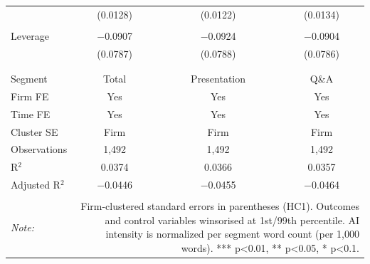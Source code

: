 \begin{table}[!htbp]
\begin{tabular}{@{\extracolsep{5pt}}lccc}
  & (0.0128) & (0.0122) & (0.0134) \\ 
  & & & \\ 
 Leverage & $-$0.0907 & $-$0.0924 & $-$0.0904 \\ 
  & (0.0787) & (0.0788) & (0.0786) \\ 
  & & & \\ 
\hline \\[-1.8ex] 
Segment & Total & Presentation & Q\&A \\ 
Firm FE & Yes & Yes & Yes \\ 
Time FE & Yes & Yes & Yes \\ 
Cluster SE & Firm & Firm & Firm \\ 
Observations & 1,492 & 1,492 & 1,492 \\ 
R$^{2}$ & 0.0374 & 0.0366 & 0.0357 \\ 
Adjusted R$^{2}$ & $-$0.0446 & $-$0.0455 & $-$0.0464 \\ 
\hline 
\hline \\[-1.8ex] 
\textit{Note:}  & \multicolumn{3}{r}{Firm-clustered standard errors in parentheses (HC1). Outcomes and control variables winsorised at 1st/99th percentile. AI intensity is normalized per segment word count (per 1,000 words). *** p<0.01, ** p<0.05, * p<0.1.} \\ 
\end{tabular} 
\end{table} 
